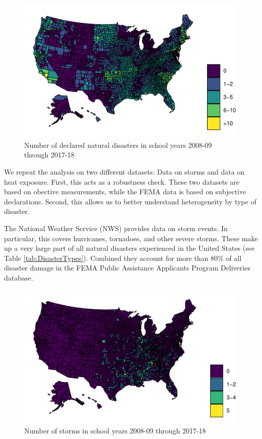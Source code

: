 \begin{figure}[!h]
	\centering
	\includegraphics[scale=1]{"../Code & Data/DisasterMap.pdf"}
	\caption{Number of declared natural disasters in school years 2008-09 through 2017-18}
	\label{DisasterMap}
\end{figure}



We repeat the analysis on two different datasets: Data on storms and data on heat exposure. First, this acts as a robustness check. These two datasets are based on obective measurements, while the FEMA data is based on subjective declarations. Second, this allows us to better understand heterogeneity by type of disaster.

The National Weather Service (NWS) provides data on storm events. In particular, this covers hurricanes, tornadoes, and other severe storms. These make up a very large part of all natural disasters experienced in the United States (see Table \ref{tab:DisasterTypes}). Combined they account for more than 80\% of all disaster damage in the FEMA Public Assistance Applicants Program Deliveries database.

\begin{figure}[!h]
	\centering
	\includegraphics[scale=1]{"../Code & Data/StormMap.pdf"}
	\caption{Number of storms in school years 2008-09 through 2017-18}
	\label{StormMap}
\end{figure}

